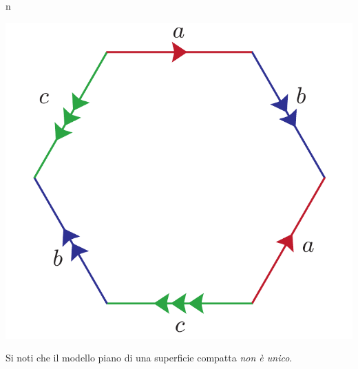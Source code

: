 \begin{remark}{n}
\begin{center}
	\includegraphics[trim=0cm 0cm 0cm 0cm, clip, scale=0.375]{images/modellopiano.pdf}
\end{center}
Si noti che il modello piano di una superficie compatta \textit{non è unico}.
\end{remark}
